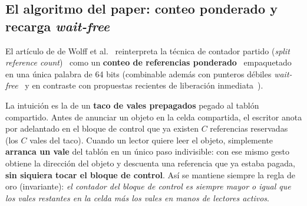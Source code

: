 \documentclass[11pt,a4paper]{article}
\begin{document}
\subsection{El algoritmo del paper: conteo ponderado y recarga \emph{wait-free}}
El artículo de de Wolff et al.~\cite{dewolff2024waitfree} reinterpreta la técnica de contador partido (\emph{split reference count})~\cite{lee2010fast,williams2012concurrency} como un \textbf{conteo de referencias ponderado}~\cite{bevan1987weighted,watson1987weighted} empaquetado en una única palabra de 64 bits (combinable además con punteros débiles \emph{wait-free}~\cite{parkinson2023weak} y en contraste con propuestas recientes de liberación inmediata~\cite{jung2024circ}).

La intuición es la de un \textbf{taco de vales prepagados} pegado al tablón compartido. Antes de anunciar un objeto en la celda compartida, el escritor anota por adelantado en el bloque de control que ya existen $C$ referencias reservadas (los $C$ vales del taco). Cuando un lector quiere leer el objeto, simplemente \textbf{arranca un vale} del tablón en un único paso indivisible: con ese mismo gesto obtiene la dirección del objeto y descuenta una referencia que ya estaba pagada, \textbf{sin siquiera tocar el bloque de control}. Así se mantiene siempre la regla de oro (invariante): \emph{el contador del bloque de control es siempre mayor o igual que los vales restantes en la celda más los vales en manos de lectores activos}.
\end{document}
